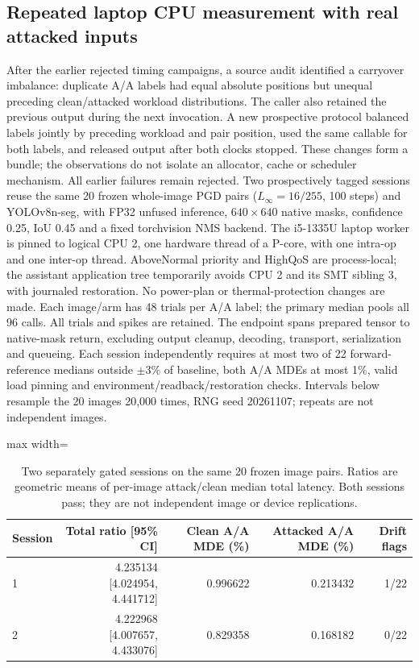 \subsection{Repeated laptop CPU measurement with real attacked inputs}
\label{app:seg-laptop}
After the earlier rejected timing campaigns, a source audit identified a carryover imbalance: duplicate A/A labels had equal absolute positions but unequal preceding clean/attacked workload distributions. The caller also retained the previous output during the next invocation. A new prospective protocol balanced labels jointly by preceding workload and pair position, used the same callable for both labels, and released output after both clocks stopped. These changes form a bundle; the observations do not isolate an allocator, cache or scheduler mechanism. All earlier failures remain rejected.
Two prospectively tagged sessions reuse the same 20 frozen whole-image PGD pairs ($L_\infty=16/255$, 100 steps) and YOLOv8n-seg, with FP32 unfused inference, $640\times640$ native masks, confidence 0.25, IoU 0.45 and a fixed torchvision NMS backend. The i5-1335U laptop worker is pinned to logical CPU 2, one hardware thread of a P-core, with one intra-op and one inter-op thread. AboveNormal priority and HighQoS are process-local; the assistant application tree temporarily avoids CPU 2 and its SMT sibling 3, with journaled restoration. No power-plan or thermal-protection changes are made.
Each image/arm has 48 trials per A/A label; the primary median pools all 96 calls. All trials and spikes are retained. The endpoint spans prepared tensor to native-mask return, excluding output cleanup, decoding, transport, serialization and queueing. Each session independently requires at most two of 22 forward-reference medians outside $\pm3\%$ of baseline, both A/A MDEs at most 1\%, valid load pinning and environment/readback/restoration checks. Intervals below resample the 20 images 20,000 times, RNG seed 20261107; repeats are not independent images.
\begin{table}[t]\centering
\caption{Two separately gated sessions on the same 20 frozen image pairs. Ratios are geometric means of per-image attack/clean median total latency. Both sessions pass; they are not independent image or device replications.}
\label{tab:seg-laptop}
\begin{adjustbox}{max width=\textwidth}\begin{tabular}{lrrrr}\toprule
Session & Total ratio [95\% CI] & Clean A/A MDE (\%) & Attacked A/A MDE (\%) & Drift flags\\\midrule
1 & 4.235134 [4.024954, 4.441712] & 0.996622 & 0.213432 & 1/22 \\
2 & 4.222968 [4.007657, 4.433076] & 0.829358 & 0.168182 & 0/22 \\
\bottomrule\end{tabular}\end{adjustbox}\end{table}
